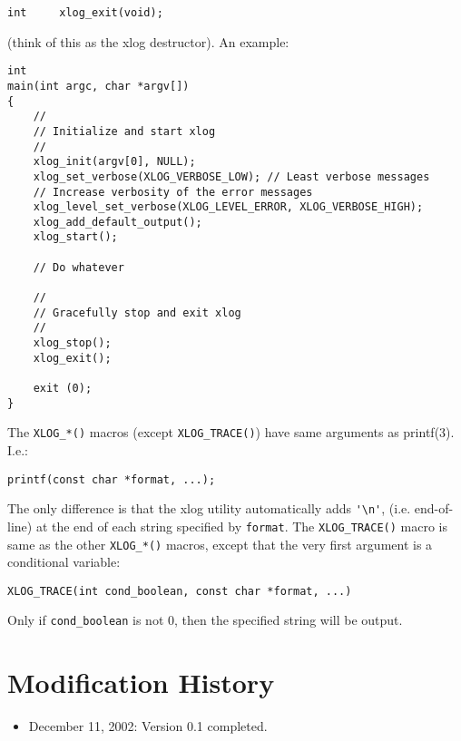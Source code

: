 \documentclass[11pt]{article}
\begin{document}
\begin{itemize}
\begin{verbatim}
int     xlog_exit(void);
\end{verbatim}
	
	(think of this as the xlog destructor).
	An example:

\begin{verbatim}
int
main(int argc, char *argv[])
{
    //
    // Initialize and start xlog
    //
    xlog_init(argv[0], NULL);
    xlog_set_verbose(XLOG_VERBOSE_LOW);	// Least verbose messages
    // Increase verbosity of the error messages
    xlog_level_set_verbose(XLOG_LEVEL_ERROR, XLOG_VERBOSE_HIGH);
    xlog_add_default_output();
    xlog_start();

    // Do whatever

    //
    // Gracefully stop and exit xlog
    //
    xlog_stop();
    xlog_exit();

    exit (0);
}
\end{verbatim}

\end{itemize}


The \verb=XLOG_*()= macros (except \verb=XLOG_TRACE()=)
have same arguments as printf(3). I.e.:

\begin{verbatim}
printf(const char *format, ...);
\end{verbatim}

The only difference is that the xlog utility automatically
adds \verb='\n'=, (i.e. end-of-line) at the end of each string
specified by \verb=format=.
The \verb=XLOG_TRACE()= macro is same as the other \verb=XLOG_*()= macros,
except that the very first argument is a conditional variable:

\begin{verbatim}
XLOG_TRACE(int cond_boolean, const char *format, ...)
\end{verbatim}

Only if \verb=cond_boolean= is not 0, then the specified string will
be output.


 
\appendix
\section{Modification History}

\begin{itemize}

  \item December 11, 2002: Version 0.1 completed.

\end{itemize}

%
%

\end{document}
